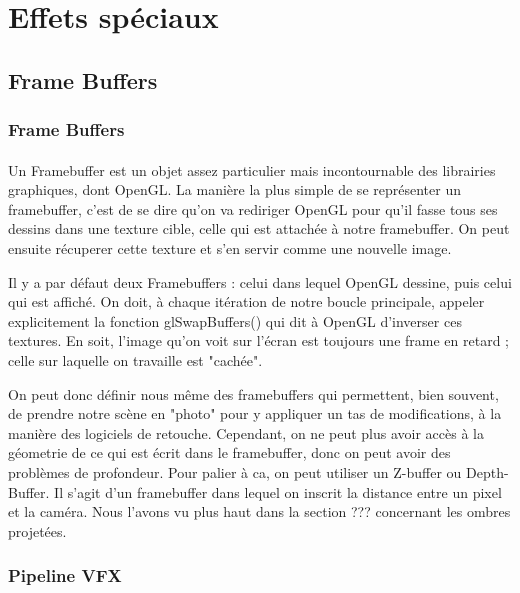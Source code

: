 \documentclass{EPUProjetDi}
\begin{document}
\section{Effets spéciaux}

\subsection{Frame Buffers} %
\subsubsection{Frame Buffers} %

\label{sec:framebuffers}


\paragraph{}
Un Framebuffer est un objet assez particulier mais incontournable des librairies graphiques, dont OpenGL.
La manière la plus simple de se représenter un framebuffer, c'est de se dire qu'on va rediriger OpenGL pour qu'il fasse tous ses dessins dans une texture cible, celle qui est attachée à notre framebuffer. On peut ensuite récuperer cette texture et s'en servir comme une nouvelle image.

Il y a par défaut deux Framebuffers : celui dans lequel OpenGL dessine, puis celui qui est affiché. On doit, à chaque itération de notre boucle principale, appeler explicitement la fonction glSwapBuffers() qui dit à OpenGL d'inverser ces textures.
En soit, l'image qu'on voit sur l'écran est toujours une frame en retard ; celle sur laquelle on travaille est "cachée".

On peut donc définir nous même des framebuffers qui permettent, bien souvent, de prendre notre scène en "photo" pour y appliquer un tas de modifications, à la manière des logiciels de retouche.
Cependant, on ne peut plus avoir accès à la géometrie de ce qui est écrit dans le framebuffer, donc on peut avoir des problèmes de profondeur.
Pour palier à ca, on peut utiliser un Z-buffer ou Depth-Buffer. Il s'agit d'un framebuffer dans lequel on inscrit la distance entre un pixel et la caméra. Nous l'avons vu plus haut dans la section ??? concernant les ombres projetées.



\subsubsection{Pipeline VFX} %
\end{document}
